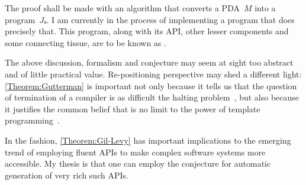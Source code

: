 The proof shall be made with an algorithm that converts a
  PDA~$M$ into a program~$Jₛ$.
I am currently in the process of implementing a program that
  does precisely that.
This program, along with its API, other lesser components and
  some connecting tissue, are to be known as \Self.

The above discussion, formalism and conjecture may seem at sight too abstract
  and of little practical value.
Re-positioning perspective may shed a different light:
\cref{Theorem:Gutterman} is important not only because it tells us
  that the question of termination of a \CC compiler is as difficult
  the halting problem~\cite{Turing:1936}, but also because it
  justifies the common belief that is no limit to the power of
  template programming~\cite{Musser:Stepanov:1989,Dehnert:Stepanov:2000
  ,Backhouse:Jansson:1999, Austern:1998,Bracha:Odersky:1998,Garcia:Jarvi:2003}.

In the fashion, \cref{Theorem:Gil-Levy} has important
  implications to the emerging trend of employing fluent APIs
  to make complex software systems more accessible.
My thesis is that one can employ the conjecture for
  automatic generation of very rich such APIs.
